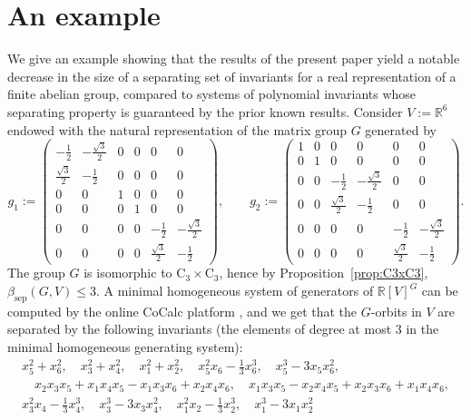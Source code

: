 \documentclass[12pt, oneside]{amsart}
\def\RR{\mathbb{R}}
\def\sepbeta{\beta_{\mathrm{sep}}}
\begin{document}
\section{An example} \label{sec:an example}

We give an example showing that the results of the present paper yield a notable 
decrease in the size of a separating set of invariants for a real representation 
of a finite abelian group, compared to systems of polynomial invariants whose separating property is guaranteed 
by the prior known results.  
Consider $V:=\RR^6$ endowed with the natural representation of the matrix group $G$ generated by 
\[g_1:=\left(\begin{array}{rrrrrr}
-\frac{1}{2} & -\frac{\sqrt{3}}2& 0 & 0 & 0 & 0 \\
\frac{\sqrt{3}}2& -\frac{1}{2} & 0 & 0 & 0 & 0 \\
0 & 0 & 1 & 0 & 0 & 0 \\
0 & 0 & 0 & 1 & 0 & 0 \\
0 & 0 & 0 & 0 & -\frac{1}{2} & -\frac{\sqrt{3}}2\\
0 & 0 & 0 & 0 & \frac{\sqrt{3}}2& -\frac{1}{2}
\end{array}\right), 
\qquad g_2:=\left(\begin{array}{rrrrrr}
1 & 0 & 0 & 0 & 0 & 0 \\
0 & 1 & 0 & 0 & 0 & 0 \\
0 & 0 & -\frac{1}{2} & -\frac{\sqrt{3}}2& 0 & 0 \\
0 & 0 & \frac{\sqrt{3}}2& -\frac{1}{2} & 0 & 0 \\
0 & 0 & 0 & 0 & -\frac{1}{2} & -\frac{\sqrt{3}}2\\
0 & 0 & 0 & 0 & \frac{\sqrt{3}}2& -\frac{1}{2}
\end{array}\right).\]
The group $G$ is isomorphic to $\mathrm{C}_3\times\mathrm{C}_3$, hence by Proposition~\ref{prop:C3xC3}, 
$\sepbeta(G,V)\le 3$. 
A minimal homogeneous system of generators of $\RR[V]^G$ can be computed by the online CoCalc platform \cite{CoCalc}, and 
we get that the $G$-orbits in $V$ are separated by the following invariants 
(the elements of degree at most $3$ in the minimal homogeneous generating system):   
\begin{align*}x_{5}^{2} + x_{6}^{2}, \quad x_{3}^{2} + x_{4}^{2}, \quad x_{1}^{2} + x_{2}^{2}, 
\quad x_{5}^{2} x_{6} - \frac{1}{3} x_{6}^{3},\quad  x_{5}^{3} - 3 x_{5} x_{6}^{2}, 
\\ \quad x_{2} x_{3} x_{5} + x_{1} x_{4} x_{5} - x_{1} x_{3} x_{6} + x_{2} x_{4} x_{6}, 
\quad x_{1} x_{3} x_{5} - x_{2} x_{4} x_{5} + x_{2} x_{3} x_{6} + x_{1} x_{4} x_{6}, 
\\ x_{3}^{2} x_{4} - \frac{1}{3} x_{4}^{3}, \quad x_{3}^{3} - 3 x_{3} x_{4}^{2}, \quad x_{1}^{2} x_{2} - \frac{1}{3} x_{2}^{3},\quad  x_{1}^{3} - 3 x_{1} x_{2}^{2}
\end{align*} 
\end{document}
